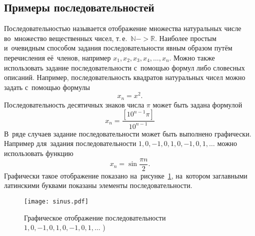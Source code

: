 \documentclass[]{scrartcl}
\begin{document}
{{\subsection{Примеры последовательностей}
Последовательностью называется отображение множества натуральных числе во~множество вещественных чисел, т.\,е.~$\mathbb{N} -> \mathbb{R}$. Наиболее простым и~очевидным способом задания последовательности явным образом путём перечисления её~членов, например $x_1, x_2, x_3, x_4,\ldots, x_n$. Можно также использовать задание последовательности с~помощью формул либо словесных описаний. Например, последовательность квадратов натуральных чисел можно задать с~помощью формулы
\begin{equation}\label{eq:conseq-squares}
x_n=x^2.
\end{equation}
Последовательность десятичных знаков числа $\pi$ может быть задана формулой
\begin{equation}\label{eq:conseq-pi}
x_n=\frac{[10^{n-1}\pi]}{10^{n-1}}
\end{equation}
В~ряде случаев задание последовательности может быть выполнено графически. Например для~задания последовательности $1, 0, -1, 0, 1, 0, -1, 0, 1,\ldots$ можно использовать функцию
\begin{equation}\label{eq:sinus}
x_n=\sin \frac{\pi n}{2}.
\end{equation}
Графически такое отображение показано на~рисунке~\ref{fig:sinus}, на~котором заглавными латинскими буквами показаны элементы последовательности.
\begin{figure}[ht]
	\centering %
	\texttt{[image: sinus.pdf]}
	\caption{Графическое отображение последовательности $1, 0, -1, 0, 1, 0, -1, 0, 1,\ldots$ )}\label{fig:sinus}
\end{figure}
}}
\end{document}

